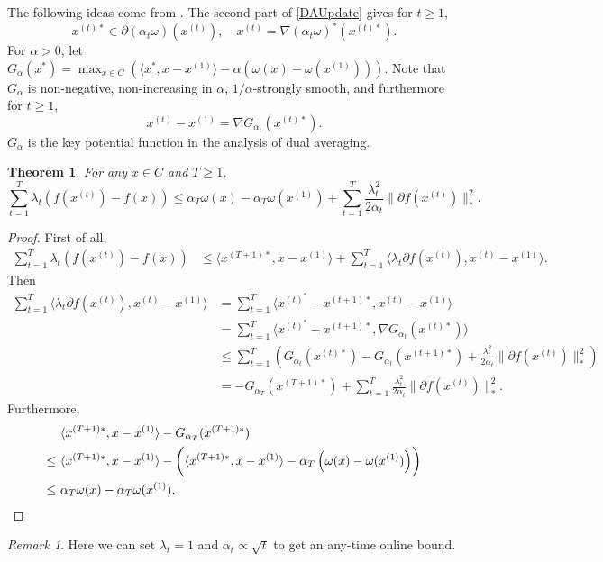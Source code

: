 \documentclass[openany]{book}
\newtheorem{theorem}{Theorem}[chapter]
\theoremstyle{definition}
\theoremstyle{remark}
\newtheorem*{remark}{Remark}
\begin{document}
The following ideas come from \cite{N09}. The second part of \eqref{DAUpdate} gives for $t\ge1$,
\begin{equation*}
    x^{(t)*}\in\partial(\alpha_t\omega)(x^{(t)}),\quad x^{(t)}=\nabla(\alpha_t\omega)^*(x^{(t)*}).
\end{equation*}
For $\alpha>0$, let $G_{\alpha}(x^*)=\max_{x\in C}\left(\langle x^*,x-x^{(1)}\rangle-\alpha\left(\omega(x)-\omega(x^{(1)})\right)\right)$. Note that $G_{\alpha}$ is non-negative, non-increasing in $\alpha$, $1/\alpha$-strongly smooth, and furthermore for $t\ge1$,
\begin{equation*}
    x^{(t)}-x^{(1)}=\nabla G_{\alpha_t}(x^{(t)*}).
\end{equation*}
$G_{\alpha}$ is the key potential function in the analysis of dual averaging.
\begin{theorem}
    For any $x\in C$ and $T\ge1$,
    \begin{equation*}
        \sum_{t=1}^{T}\lambda_t\left(f(x^{(t)})-f(x)\right)\le\alpha_T\omega(x)-\alpha_T\omega(x^{(1)})+\sum_{t=1}^{T}\frac{\lambda_t^2}{2\alpha_t}\|\partial f(x^{(t)})\|_*^2.
    \end{equation*}
\end{theorem}
\begin{proof}
    First of all,
    \begin{align*}
        \sum_{t=1}^{T}\lambda_t\left(f(x^{(t)})-f(x)\right) & \le\langle x^{(T+1)*},x-x^{(1)}\rangle+\sum_{t=1}^{T}\langle\lambda_t\partial f(x^{(t)}),x^{(t)}-x^{(1)}\rangle.
    \end{align*}
    Then
    \begin{align*}
        \sum_{t=1}^{T}\langle\lambda_t\partial f(x^{(t)}),x^{(t)}-x^{(1)}\rangle & =\sum_{t=1}^{T}\langle x^{(t)^*}-x^{(t+1)*},x^{(t)}-x^{(1)}\rangle \\
         & =\sum_{t=1}^{T}\langle x^{(t)^*}-x^{(t+1)*},\nabla G_{\alpha_t}(x^{(t)*})\rangle \\
         & \le \sum_{t=1}^{T}\left(G_{\alpha_t}(x^{(t)*})-G_{\alpha_t}(x^{(t+1)*})+\frac{\lambda_t^2}{2\alpha_t}\|\partial f(x^{(t)})\|_*^2\right) \\
         & =-G_{\alpha_T}(x^{(T+1)*})+\sum_{t=1}^{T}\frac{\lambda_t^2}{2\alpha_t}\|\partial f(x^{(t)})\|_*^2.
    \end{align*}
    Furthermore,
    \begin{align*}
         & \ \langle x^{(T+1)*},x-x^{(1)}\rangle-G_{\alpha_T}(x^{(T+1)*}) \\
        \le &\ \langle x^{(T+1)*},x-x^{(1)}\rangle-\del{\langle x^{(T+1)*},x-x^{(1)}\rangle-\alpha_T\del{\omega(x)-\omega(x^{(1)})}} \\
        \le & \ \alpha_T\omega(x)-\alpha_T\omega(x^{(1)}).
    \end{align*}
\end{proof}
\begin{remark}
    Here we can set $\lambda_t=1$ and $\alpha_t\propto\sqrt{t}$ to get an any-time online bound.
\end{remark}
\end{document}
